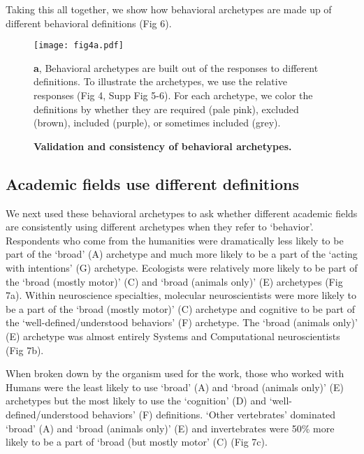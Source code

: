 \documentclass[a4paper, 11pt]{article}
\begin{document}
Taking this all together, we show how behavioral archetypes are made up of different behavioral definitions (Fig 6).

\begin{figure}
\centerline{\texttt{[image: fig4a.pdf]}}
\caption{\textbf{Validation and consistency of behavioral archetypes.}} \textbf{a}, Behavioral archetypes are built out of the responses to different definitions. To illustrate the archetypes, we use the relative responses (Fig 4, Supp Fig 5-6). For each archetype, we color the definitions by whether they are required (pale pink), excluded (brown), included (purple), or sometimes included (grey).
\end{figure}

\subsection*{Academic fields use different definitions}
We next used these behavioral archetypes to ask whether different academic fields are consistently using different archetypes when they refer to `behavior'. Respondents who come from the humanities were dramatically less likely to be part of the `broad' (A) archetype and much more likely to be a part of the `acting with intentions' (G) archetype. Ecologists were relatively more likely to be part of the `broad (mostly motor)' (C) and `broad (animals only)' (E) archetypes (Fig 7a). Within neuroscience specialties, molecular neuroscientists were more likely to be a part of the `broad (mostly motor)' (C) archetype and cognitive to be part of the `well-defined/understood behaviors' (F) archetype. The `broad (animals only)' (E) archetype was almost entirely Systems and Computational neuroscientists (Fig 7b).

When broken down by the organism used for the work, those who worked with Humans were the least likely to use `broad' (A) and `broad (animals only)' (E) archetypes but the most likely to use the `cognition' (D) and `well-defined/understood behaviors' (F) definitions. `Other vertebrates' dominated `broad' (A) and `broad (animals only)' (E) and invertebrates were 50\% more likely to be a part of `broad (but mostly motor' (C) (Fig 7c).
\end{document}

